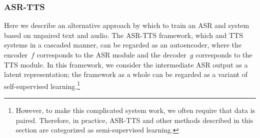 

\subsubsection{ASR-TTS}
Here we describe an alternative approach by which to train an ASR and  system
based on unpaired text and audio. The ASR-TTS framework, which  and
TTS systems in a cascaded manner,
can be regarded as an autoencoder, where the encoder~$f$
corresponds to the ASR module and the decoder~$g$ corresponds to the TTS module.
In this framework, we consider the intermediate ASR output as a latent
representation; the framework as a whole can be regarded as a variant of
self-supervised learning.\footnote{However, to make this complicated
system work, we often require that data is paired. Therefore, in practice,
ASR-TTS and other methods described in this section are categorized as
semi-supervised learning.}

